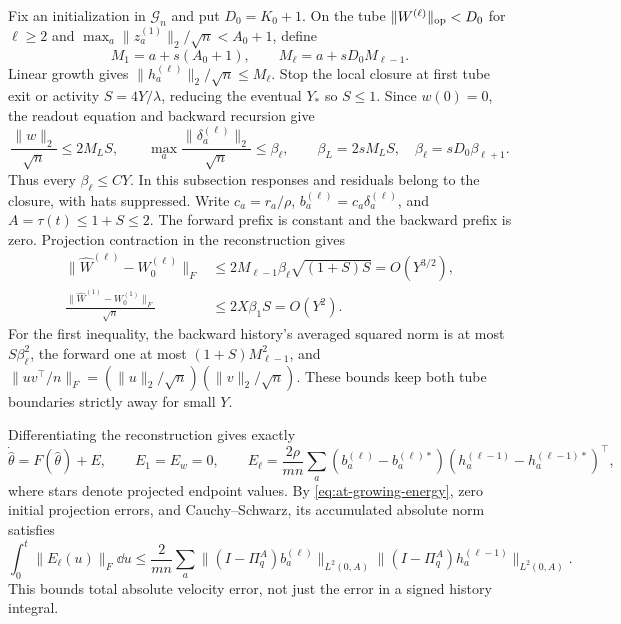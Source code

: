 Fix an initialization in $\mathcal G_n$ and put $D_0=K_0+1$.
On the tube $\|W^{(\ell)}\|_{\rm op}<D_0$ for $\ell\ge2$ and
$\max_a\|z_a^{(1)}\|_2/\sqrt n<A_0+1$, define
\[
 M_1=a+s(A_0+1),\qquad M_\ell=a+sD_0M_{\ell-1}.
\]
Linear growth gives $\|h_a^{(\ell)}\|_2/\sqrt n\le M_\ell$.
Stop the local closure at first tube exit or activity
$S=4Y/\lambda$, reducing the eventual $Y_*$ so $S\le1$.
Since $w(0)=0$, the readout equation and backward recursion give
\begin{equation}
 \frac{\|w\|_2}{\sqrt n}\le2M_LS,
 \qquad \max_a\frac{\|\delta_a^{(\ell)}\|_2}{\sqrt n}
 \le\beta_\ell,\qquad
 \beta_L=2sM_LS,\quad\beta_\ell=sD_0\beta_{\ell+1}.
 \label{eq:at-rms}
\end{equation}
Thus every $\beta_\ell\le CY$.  In this subsection responses and
residuals belong to the closure, with hats suppressed.
Write $c_a=r_a/\rho$, $b_a^{(\ell)}=c_a\delta_a^{(\ell)}$,
and $A=\tau(t)\le1+S\le2$.  The forward prefix is constant and the
backward prefix is zero.  Projection contraction in the reconstruction gives
\begin{align}
 \|\widehat W^{(\ell)}-W_0^{(\ell)}\|_F
 &\le2M_{\ell-1}\beta_\ell\sqrt{(1+S)S}=O(Y^{3/2}),
 \label{eq:at-hidden-tube}\\
 \frac{\|\widehat W^{(1)}-W_0^{(1)}\|_F}{\sqrt n}
 &\le2X\beta_1S=O(Y^2).
 \label{eq:at-first-tube}
\end{align}
For the first inequality, the backward history's averaged squared norm
is at most $S\beta_\ell^2$, the forward one at most
$(1+S)M_{\ell-1}^2$, and
$\|uv^\top/n\|_F=(\|u\|_2/\sqrt n)(\|v\|_2/\sqrt n)$.
These bounds keep both tube boundaries strictly away for small $Y$.

Differentiating the reconstruction gives exactly
\begin{equation}
 \dot{\widehat\theta}=F(\widehat\theta)+E,\qquad E_1=E_w=0,
 \qquad E_\ell=\frac{2\rho}{mn}\sum_a
       (b_a^{(\ell)}-b_a^{(\ell)*})
       (h_a^{(\ell-1)}-h_a^{(\ell-1)*})^\top,
 \label{eq:at-defect}
\end{equation}
where stars denote projected endpoint values.  By
\eqref{eq:at-growing-energy}, zero initial projection errors, and
Cauchy--Schwarz, its accumulated absolute norm satisfies
\begin{equation}
 \int_0^t\|E_\ell(u)\|_F\dd u
 \le\frac2{mn}\sum_a
 \|(I-\Pi_q^A)b_a^{(\ell)}\|_{L^2(0,A)}
 \|(I-\Pi_q^A)h_a^{(\ell-1)}\|_{L^2(0,A)}.
 \label{eq:at-defect-product}
\end{equation}
This bounds total absolute velocity error, not just the error in a signed
history integral.

